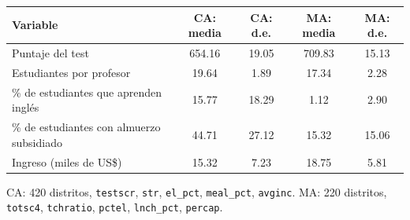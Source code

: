 
\begin{tabular}{lcccc}
\toprule
Variable & CA: media & CA: d.e. & MA: media & MA: d.e.\\
\midrule
Puntaje del test & 654.16 & 19.05 & 709.83 & 15.13\\
Estudiantes por profesor & 19.64 & 1.89 & 17.34 & 2.28\\
\% de estudiantes que aprenden ingl\'es & 15.77 & 18.29 & 1.12 & 2.90\\
\% de estudiantes con almuerzo subsidiado & 44.71 & 27.12 & 15.32 & 15.06\\
Ingreso (miles de US\$) & 15.32 & 7.23 & 18.75 & 5.81\\
\bottomrule
\end{tabular}
\par\vspace{3pt}
{\footnotesize\parbox{0.9\linewidth}{\centering CA: 420 distritos, \texttt{testscr}, \texttt{str}, \texttt{el\_pct}, \texttt{meal\_pct}, \texttt{avginc}. MA: 220 distritos, \texttt{totsc4}, \texttt{tchratio}, \texttt{pctel}, \texttt{lnch\_pct}, \texttt{percap}.}}
